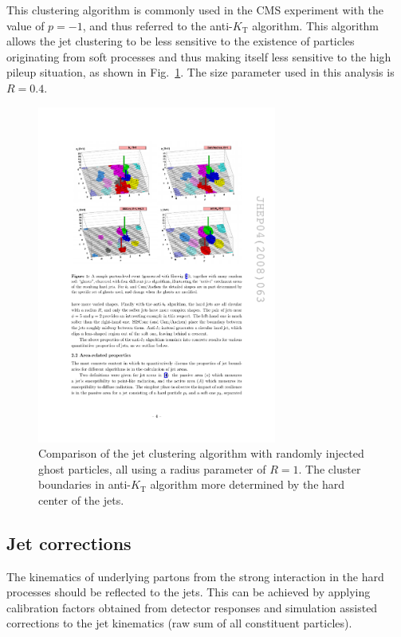 This clustering algorithm is commonly used in the CMS experiment with the value of $p=-1$, and thus referred to the anti-$K_{\mathrm{T}}$ algorithm.
This algorithm allows the jet clustering to be less sensitive to the existence of particles originating from soft processes and thus making itself less sensitive to the high pileup situation, as shown in Fig.~\ref{fig:reco_antikt.png}.
The size parameter used in this analysis is $R=0.4$.
\begin{figure}\centering
    \includegraphics[width=0.7\textwidth]{figure/reco_antikt.pdf}
    \caption[Comparison of the jet clustering algorithm.]
    {
        Comparison of the jet clustering algorithm with randomly injected ghost particles, all using a radius parameter of $R=1$.
        The cluster boundaries in anti-$K_{\mathrm{T}}$ algorithm more determined by the hard center of the jets.
    }
    \label{fig:reco_antikt.png}
\end{figure}

\subsection{Jet corrections}
The kinematics of underlying partons from the strong interaction in the hard processes should be reflected to the jets.
This can be achieved by applying calibration factors obtained from detector responses and simulation assisted corrections to the jet kinematics (raw sum of all constituent particles).

